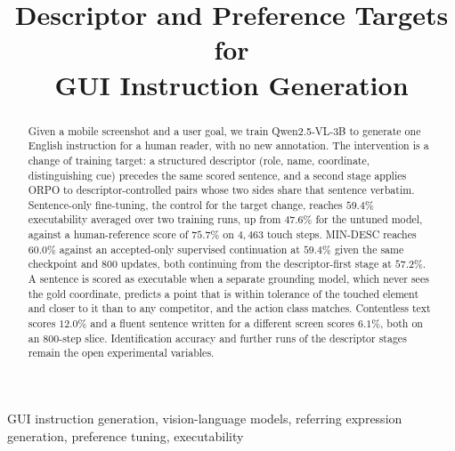 \documentclass[conference]{IEEEtran}
\begin{document}
\title{Descriptor and Preference Targets for\\
GUI Instruction Generation}


\author{
\and
{}
}

\maketitle

\begin{abstract}
Given a mobile screenshot and a user goal, we train Qwen2.5-VL-3B to generate one English
instruction for a human reader, with no new annotation. The intervention is a change of
training target: a structured descriptor (role, name, coordinate, distinguishing cue)
precedes the same scored sentence, and a second stage applies ORPO to descriptor-controlled
pairs whose two sides share that sentence verbatim. Sentence-only fine-tuning, the control
for the target change, reaches $59.4\%$ executability averaged over two training runs, up from
$47.6\%$ for the untuned model, against a human-reference score of $75.7\%$ on $4{,}463$ touch
steps. MIN-DESC reaches $60.0\%$ against an accepted-only supervised continuation at $59.4\%$
given the same checkpoint and $800$ updates, both continuing from the descriptor-first stage at
$57.2\%$. A sentence is scored as executable when a separate grounding model, which never sees
the gold coordinate, predicts a point that is within tolerance of the touched element and closer
to it than to any competitor, and the action class matches. Contentless text scores $12.0\%$
and a fluent sentence written for a different screen scores $6.1\%$, both on an $800$-step
slice. Identification accuracy and further runs of the descriptor stages remain the open
experimental variables.
\end{abstract}

\begin{IEEEkeywords}
GUI instruction generation, vision-language models, referring expression generation,
preference tuning, executability
\end{IEEEkeywords}
\end{document}
